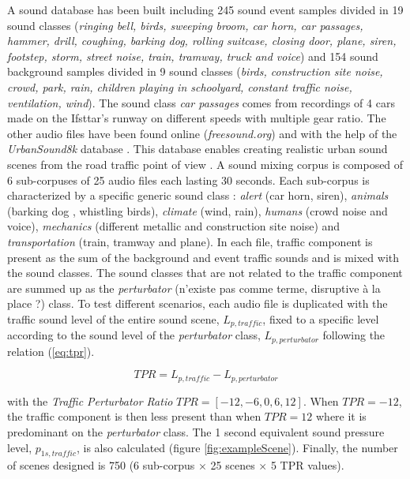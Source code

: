 \documentclass[twocolumn,a4paper,10pt]{article}
\begin{document}
A sound database has been built including 245 sound event samples divided in 19 sound classes (\textit{ringing bell, birds, sweeping broom, car horn, car passages, hammer, drill, coughing, barking dog, rolling suitcase, closing door, plane, siren, footstep, storm, street noise, train, tramway, truck and voice}) and 154 sound background samples divided in 9 sound classes (\textit{birds, construction site noise, crowd, park, rain, children playing in schoolyard, constant traffic noise, ventilation, wind}). The sound class \textit{car passages} comes from recordings of 4 cars made on the Ifsttar's runway on different speeds with multiple gear ratio. The other audio files have been found online (\textit{freesound.org}) and with the help of the \textit{UrbanSound8k} database \cite{salamon_dataset_nodate}. This database enables creating realistic urban sound scenes from the road traffic point of view \cite{gloaguen_creation_2017}. A sound mixing corpus is composed of 6 sub-corpuses of 25 audio files each lasting 30 seconds. Each sub-corpus is characterized by a specific generic sound class : \textit{alert} (car horn, siren), \textit{animals} (barking dog , whistling birds), \textit{climate} (wind, rain), \textit{humans} (crowd noise and voice), \textit{mechanics} (different metallic and construction site noise) and \textit{transportation} (train, tramway and plane). In each file, traffic component is present as the sum of the background and event traffic sounds and is mixed with the sound classes. The sound classes that are not related to the traffic component are summed up as the \textit{perturbator} (n'existe pas comme terme, disruptive à la place ?) class. To test different scenarios, each audio file is duplicated with the traffic sound level of the entire sound scene, $L_{p,traffic}$, fixed to a specific level according to the sound level of the \textit{perturbator} class, $L_{p,perturbator}$ following the relation (\ref{eq:tpr}).

\begin{equation}\label{eq:tpr}
TPR = L_{p,traffic}-L_{p,perturbator}
\end{equation}

with the \textit{Traffic Perturbator Ratio} $TPR = \left[-12, -6, 0, 6, 12\right]$. When $TPR = -12$, the traffic component is then less present than when $TPR = 12$ where it is predominant on the \textit{perturbator} class. The 1 second equivalent sound pressure level, $p_{1s,traffic}$, is also calculated (figure \ref{fig:exampleScene}). Finally, the number of scenes designed is 750 (6 sub-corpus $\times$ 25 scenes $\times$  5 TPR values).
\end{document}

